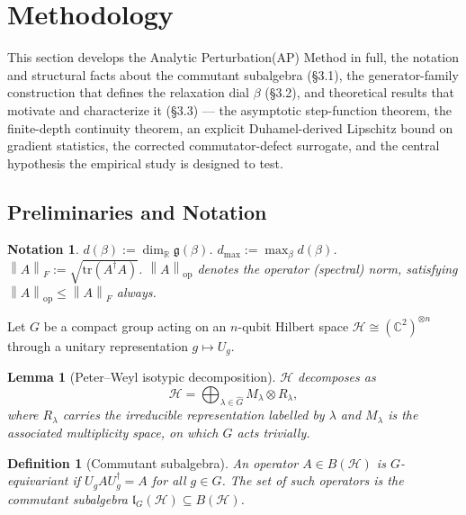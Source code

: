 \documentclass[pdflatex,sn-mathphys-num]{sn-jnl}
\theoremstyle{thmstyleone}
\newtheorem{lemma}[theorem]{Lemma}
\theoremstyle{thmstyletwo}
\theoremstyle{thmstylethree}
\newtheorem{definition}{Definition}
\newtheorem{notation}{Notation}
\newcommand{\Hil}{\mathcal{H}}
\newcommand{\lG}{\mathfrak{l}_G(\Hil)}
\newcommand{\opnorm}[1]{\left\lVert #1 \right\rVert_{\mathrm{op}}}
\newcommand{\fronorm}[1]{\left\lVert #1 \right\rVert_{F}}
\begin{document}
\section{Methodology}



This section develops the Analytic Perturbation(AP) Method in full, the notation and structural
facts about the commutant subalgebra (\S3.1), the generator-family construction that defines the relaxation dial
$\beta$ (\S3.2), and theoretical results that motivate and characterize it (\S3.3) — the asymptotic step-function
theorem, the finite-depth continuity theorem, an explicit Duhamel-derived Lipschitz bound on gradient statistics,
the corrected commutator-defect surrogate, and the central hypothesis the empirical study is designed to test.
\subsection{Preliminaries and Notation}

\begin{notation}
\label{not:symbols}
$d(\beta) := \dim_{\mathbb{R}} \mathfrak{g}(\beta)$.  $d_{\max} := \max_\beta d(\beta)$.  $\fronorm{A} := \sqrt{\mathrm{tr}(A^\dagger A)}$.  $\opnorm{A}$ denotes the operator (spectral) norm, satisfying $\opnorm{A} \le \fronorm{A}$ always.
\end{notation}
\label{sec:prelim}

Let $G$ be a compact group acting on an $n$-qubit Hilbert space $\Hil \cong (\mathbb{C}^2)^{\otimes n}$ through a unitary representation $g \mapsto U_g$.

\begin{lemma}[Peter--Weyl isotypic decomposition]
\label{lem:peterweyl}
$\Hil$ decomposes as
\begin{equation}
\Hil = \bigoplus_{\lambda \in \hat{G}} M_\lambda \otimes R_\lambda, \label{eq:1}
\end{equation}
where $R_\lambda$ carries the irreducible representation labelled by $\lambda$ and $M_\lambda$ is the associated multiplicity space, on which $G$ acts trivially.
\end{lemma}

\begin{definition}[Commutant subalgebra]
\label{def:commutant}
An operator $A \in B(\Hil)$ is $G$-equivariant if $U_g A U_g^\dagger = A$ for all $g \in G$. The set of such operators is the commutant subalgebra $\lG \subseteq B(\Hil)$.
\end{definition}
\end{document}
